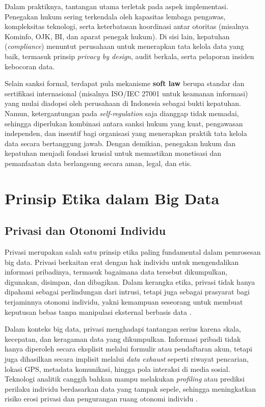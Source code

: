 Dalam praktiknya, tantangan utama terletak pada aspek implementasi. Penegakan hukum sering terkendala oleh kapasitas lembaga pengawas, kompleksitas teknologi, serta keterbatasan koordinasi antar otoritas (misalnya Kominfo, OJK, BI, dan aparat penegak hukum). Di sisi lain, kepatuhan (\textit{compliance}) menuntut perusahaan untuk menerapkan tata kelola data yang baik, termasuk prinsip \textit{privacy by design}, audit berkala, serta pelaporan insiden kebocoran data.  

Selain sanksi formal, terdapat pula mekanisme \textbf{soft law} berupa standar dan sertifikasi internasional (misalnya ISO/IEC 27001 untuk keamanan informasi) yang mulai diadopsi oleh perusahaan di Indonesia sebagai bukti kepatuhan. Namun, ketergantungan pada \textit{self-regulation} saja dianggap tidak memadai, sehingga diperlukan kombinasi antara sanksi hukum yang kuat, pengawasan independen, dan insentif bagi organisasi yang menerapkan praktik tata kelola data secara bertanggung jawab. Dengan demikian, penegakan hukum dan kepatuhan menjadi fondasi krusial untuk memastikan monetisasi dan pemanfaatan data berlangsung secara aman, legal, dan etis.


\section{Prinsip Etika dalam Big Data}

\subsection{Privasi dan Otonomi Individu}

Privasi merupakan salah satu prinsip etika paling fundamental dalam pemrosesan big data. Privasi berkaitan erat dengan hak individu untuk mengendalikan informasi pribadinya, termasuk bagaimana data tersebut dikumpulkan, digunakan, disimpan, dan dibagikan. Dalam kerangka etika, privasi tidak hanya dipahami sebagai perlindungan dari intrusi, tetapi juga sebagai prasyarat bagi terjaminnya otonomi individu, yakni kemampuan seseorang untuk membuat keputusan bebas tanpa manipulasi eksternal berbasis data \cite{westin1967, zwitter2014}.  

Dalam konteks big data, privasi menghadapi tantangan serius karena skala, kecepatan, dan keragaman data yang dikumpulkan. Informasi pribadi tidak hanya diperoleh secara eksplisit melalui formulir atau pendaftaran akun, tetapi juga dihasilkan secara implisit melalui \textit{data exhaust} seperti riwayat pencarian, lokasi GPS, metadata komunikasi, hingga pola interaksi di media sosial. Teknologi analitik canggih bahkan mampu melakukan \textit{profiling} atau prediksi perilaku individu berdasarkan data yang tampak sepele, sehingga meningkatkan risiko erosi privasi dan pengurangan ruang otonomi individu \cite{mayer2013big, taylor2017}.  

